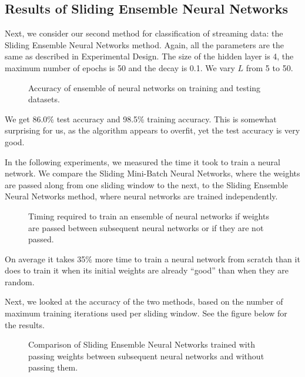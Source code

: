 \documentclass[conference]{IEEEtran}
\begin{document}
\subsection{Results of Sliding Ensemble Neural Networks}

Next, we consider our second method for classification of streaming data: the Sliding Ensemble Neural Networks method.
Again, all the parameters are the same as described in Experimental Design. The size of the hidden layer is 4, the maximum number of epochs is 50 and the decay is 0.1. We vary $L$ from 5 to 50.

\begin{figure}[H]
	\centering
	\caption{Accuracy of ensemble of neural networks on training and testing datasets.}
	\label{fig:results-nnet-ensemble}
\end{figure}

We get 86.0\% test accuracy and 98.5\% training accuracy. This is somewhat surprising for us, as the algorithm appears to overfit, yet the test accuracy is very good.

In the following experiments, we measured the time it took to train a neural network. We compare the Sliding Mini-Batch Neural Networks, where the weights are passed along from one sliding window to the next, to the Sliding Ensemble Neural Networks method, where neural networks are trained independently.

\begin{figure}[H]
	\centering
	\caption{Timing required to train an ensemble of neural networks if weights are passed between subsequent neural networks or if they are not passed.}
	\label{fig:results-nnet-ens-timing}
\end{figure}

On average it takes 35\% more time to train a neural network from scratch than it does to train it when its initial weights are already ``good'' than when they are random.

Next, we looked at the accuracy of the two methods, based on the number of maximum training iterations used per sliding window. See the figure below for the results.
\begin{figure}[H]
	\centering
	\caption{Comparison of Sliding Ensemble Neural Networks trained with passing weights between subsequent neural networks and without passing them.}
	\label{fig:benchmark}
\end{figure}
\end{document}
